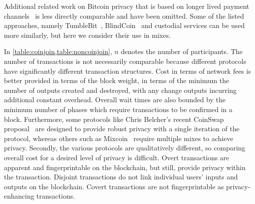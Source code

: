 \documentclass[a4paper]{article}
\begin{document}
Additional related work on Bitcoin privacy that is based on longer lived payment channels~\cite{green2017bolt, tairi2019a2l} is less directly comparable and have been omitted. Some of the listed approaches, namely TumbleBit~\cite{heilman2017tumblebit}, BlindCoin~\cite{valenta2015blindcoin} and custodial services can be used more similarly, but here we consider their use in mixes.

In \cref{table:coinjoin,table:noncoinjoin}, $n$ denotes the number of participants. The number of transactions is not necessarily comparable because different protocols have significantly different transaction structures. Cost in terms of network fees is better provided in terms of the block weight, in terms of the minimum the number of outputs created and destroyed, with any change outputs incurring additional constant overhead. Overall wait times are also bounded by the minimum number of phases which require transactions to be confirmed in a block. Furthermore, some protocols like Chris Belcher's recent CoinSwap proposal~\cite{belcher2020design} are designed to provide robust privacy with a single iteration of the protocol, whereas others such as Mixcoin~\cite{bonneau2014mixcoin} require multiple mixes to achieve privacy. Secondly, the various protocols are qualitatively different, so comparing overall cost for a desired level of privacy is difficult. Overt transactions are apparent and fingerprintable on the blockchain, but still, provide privacy within the transaction. Disjoint transactions do not link individual users' inputs and outputs on the blockchain. Covert transactions are not fingerprintable as privacy-enhancing transactions.
\end{document}
